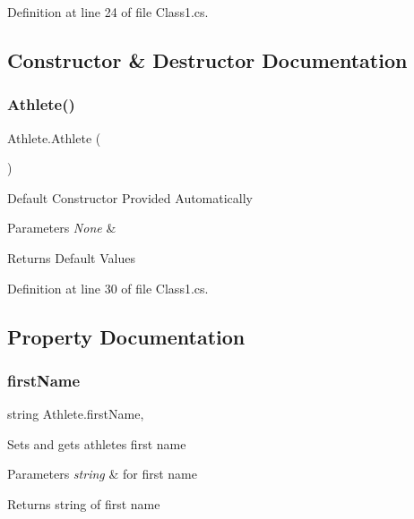 Definition at line 24 of file Class1.\+cs.



\subsection{Constructor \& Destructor Documentation}
\mbox{\label{classAthlete_a3b2ab137b0f940eee2965898bd22dadb}} 
\subsubsection{\texorpdfstring{Athlete()}{Athlete()}}
{\footnotesize\ttfamily Athlete.\+Athlete (\begin{DoxyParamCaption}{ }\end{DoxyParamCaption})\hspace{0.3cm}{\ttfamily [inline]}}

Default Constructor Provided Automatically 
\begin{DoxyParams}{Parameters}
{\em None} & \\
\hline
\end{DoxyParams}
\begin{DoxyReturn}{Returns}
Default Values 
\end{DoxyReturn}


Definition at line 30 of file Class1.\+cs.



\subsection{Property Documentation}
\mbox{\label{classAthlete_af1567abd99a20dd128959681ef7f457b}} 
\subsubsection{\texorpdfstring{first\+Name}{firstName}}
{\footnotesize\ttfamily string Athlete.\+first\+Name\hspace{0.3cm}{\ttfamily [get]}, {\ttfamily [set]}}

Sets and gets athlete\textquotesingle{}s first name 
\begin{DoxyParams}{Parameters}
{\em string} & for first name \\
\hline
\end{DoxyParams}
\begin{DoxyReturn}{Returns}
string of first name 
\end{DoxyReturn}


